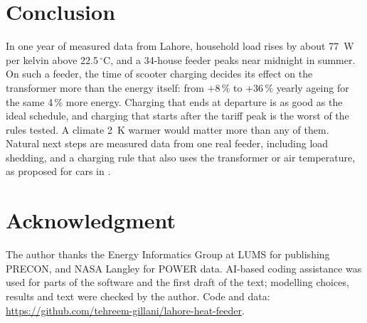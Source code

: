 \documentclass[conference]{IEEEtran}
\begin{document}
\section{Conclusion}
In one year of measured data from Lahore, household load rises by about 77~W
per kelvin above 22.5\,$^\circ$C, and a 34-house feeder peaks near midnight in
summer. On such a feeder, the time of scooter charging decides its effect on
the transformer more than the energy itself: from $+8$\,\% to $+36$\,\% yearly
ageing for the same 4\,\% more energy. Charging that ends at departure is as
good as the ideal schedule, and charging that starts after the tariff peak is
the worst of the rules tested. A climate 2~K warmer would matter more than
any of them. Natural next steps are measured data from one real feeder,
including load shedding, and a charging rule that also uses the transformer
or air temperature, as proposed for cars in \cite{hilshey2013}.

\section*{Acknowledgment}
The author thanks the Energy Informatics Group at LUMS for publishing PRECON,
and NASA Langley for POWER data. AI-based coding assistance was used for parts
of the software and the first draft of the text; modelling choices, results
and text were checked by the author. Code and data:
\url{https://github.com/tehreem-gillani/lahore-heat-feeder}.
\end{document}
